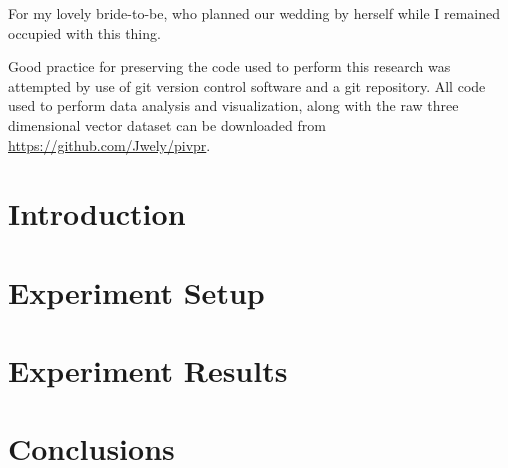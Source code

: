 \documentclass[12pt]{report}	%
\begin{document}
\beforepreface

For my lovely bride-to-be, who planned our wedding by herself while I remained 
occupied with this thing.

Good practice for preserving the code used to perform this research was 
attempted by use of git version control software and a git repository. All code 
used to perform data analysis and visualization, along with the raw three 
dimensional vector dataset can be downloaded from 
\url{https://github.com/Jwely/pivpr}.
%
\fi

\afterpreface
\iftrue		%
\chapter{Introduction}



\fi
\iftrue		%
\chapter{Experiment Setup}







\fi
\iftrue		%
\chapter{Experiment Results}
\label{chapter:results}


\fi
\iftrue		%
\chapter{Conclusions}

\fi


\end{document}
